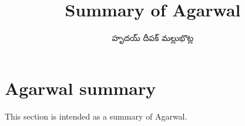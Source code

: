 \documentclass[../main.tex]{subfiles}
\title{Summary of Agarwal}
\author{\begin{telugu}హృదయ్ దీపక్ మల్లుభొట్ల\end{telugu}}
\date{}
\begin{document}
	\onlyinsubfile{\maketitle}
	\section{Agarwal summary}\label{sec:AgarwalSummary}

	This section is intended as a summary of Agarwal\supercite{Agarwal}.
\end{document}
